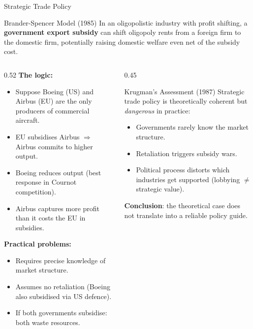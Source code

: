 \documentclass[aspectratio=169]{beamer}
\begin{document}
\begin{frame}{Strategic Trade Policy}
\begin{block}{Brander-Spencer Model (1985)}
  In an oligopolistic industry with profit shifting, a \textbf{government export subsidy} can shift oligopoly rents from a foreign firm to the domestic firm, potentially raising domestic welfare even net of the subsidy cost.
\end{block}
\vspace{0.3em}
\begin{columns}
\begin{column}{0.52\textwidth}
\textbf{The logic:}
\begin{itemize}
  \item Suppose Boeing (US) and Airbus (EU) are the only producers of commercial aircraft.
  \item EU subsidises Airbus $\Rightarrow$ Airbus commits to higher output.
  \item Boeing reduces output (best response in Cournot competition).
  \item Airbus captures more profit than it costs the EU in subsidies.
\end{itemize}
\vspace{0.2em}
\textbf{Practical problems:}
\begin{itemize}\small
  \item Requires precise knowledge of market structure.
  \item Assumes no retaliation (Boeing also subsidised via US defence).
  \item If both governments subsidise: both waste resources.
\end{itemize}
\end{column}
\begin{column}{0.45\textwidth}
\begin{insight}{Krugman's Assessment (1987)}
  Strategic trade policy is theoretically coherent but \emph{dangerous} in practice:
  \begin{itemize}\small
    \item Governments rarely know the market structure.
    \item Retaliation triggers subsidy wars.
    \item Political process distorts which industries get supported (lobbying $\neq$ strategic value).
  \end{itemize}
  \textbf{Conclusion}: the theoretical case does not translate into a reliable policy guide.
\end{insight}
\end{column}
\end{columns}
\end{frame}
\end{document}
